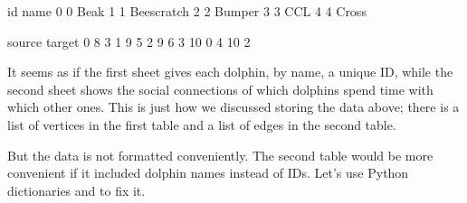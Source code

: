 \documentclass[letterpaper,10pt,english]{sphinxmanual}
\begin{document}
\begin{sphinxVerbatim}[commandchars=\\\{\}]
  \PYG{p}{[}\PYG{p}{]}
\end{sphinxVerbatim}

\begin{sphinxVerbatim}[commandchars=\\\{\}]
   id        name
0   0        Beak
1   1  Beescratch
2   2      Bumper
3   3         CCL
4   4       Cross
\end{sphinxVerbatim}

\begin{sphinxVerbatim}[commandchars=\\\{\}]
  \PYG{p}{[}\PYG{p}{]}
\end{sphinxVerbatim}

\begin{sphinxVerbatim}[commandchars=\\\{\}]
   source  target
0       8       3
1       9       5
2       9       6
3      10       0
4      10       2
\end{sphinxVerbatim}

It seems as if the first sheet gives each dolphin, by name, a unique ID, while the second sheet shows the social connections of which dolphins spend time with which other ones.  This is just how we discussed storing the data above; there is a list of vertices in the first table and a list of edges in the second table.

But the data is not formatted conveniently.  The second table would be more convenient if it included dolphin names instead of IDs.  Let’s use Python dictionaries and  to fix it.

\begin{sphinxVerbatim}[commandchars=\\\{\}]
       
    
    
\end{sphinxVerbatim}
\end{document}
